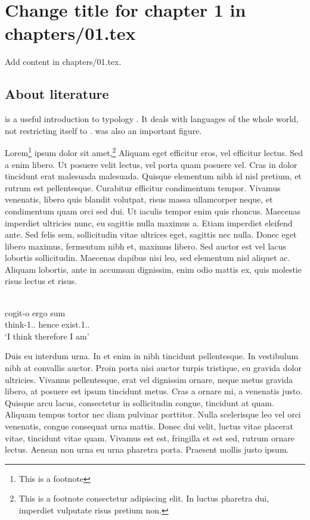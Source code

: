 \chapter{Change title for chapter 1 in chapters/01.tex}
Add content in chapters/01.tex.

\section{About literature}
\citet{Comrie1981} is a useful introduction to typology . %
It deals with languages of the whole world, not restricting itself to . %
 was also an important figure. %

Lorem\footnote{This is a footnote} ipsum dolor sit 
amet,\footnote{This is a footnote consectetur adipiscing elit. In luctus pharetra dui, imperdiet vulputate risus pretium non.} Aliquam eget efficitur eros, vel efficitur lectus. Sed a enim libero. Ut posuere velit lectus, vel porta quam posuere vel. Cras in dolor tincidunt erat malesuada malesuada. Quisque elementum nibh id nisl pretium, et rutrum est pellentesque. Curabitur efficitur condimentum tempor. Vivamus venenatis, libero quis blandit volutpat, risus massa ullamcorper neque, et condimentum quam orci sed dui. Ut iaculis tempor enim quis rhoncus. Maecenas imperdiet ultricies nunc, eu sagittis nulla maximus a. Etiam imperdiet eleifend ante. Sed felis sem, sollicitudin vitae ultrices eget, sagittis nec nulla. Donec eget libero maximus, fermentum nibh et, maximus libero. Sed auctor est vel lacus lobortis sollicitudin. Maecenas dapibus nisi leo, sed elementum nisl aliquet ac. Aliquam lobortis, ante in accumsan dignissim, enim odio mattis ex, quis molestie risus lectus et risus. 

\ea\label{ex:1:descartes}
\\
\gll cogit-o ergo sum \\
     think-1{\SG}.{\PRS}.{\IND} hence exist.1{\SG}.{\PRS}.{\IND}\\
\glt `I think therefore I am'
\z

Duis eu interdum urna. In et enim in nibh tincidunt pellentesque. In vestibulum nibh at convallis auctor. Proin porta nisi auctor turpis tristique, eu gravida dolor ultricies. Vivamus pellentesque, erat vel dignissim ornare, neque metus gravida libero, at posuere est ipsum tincidunt metus. Cras a ornare mi, a venenatis justo. Quisque arcu lacus, consectetur in sollicitudin congue, tincidunt at quam. Aliquam tempus tortor nec diam pulvinar porttitor. Nulla scelerisque leo vel orci venenatis, congue consequat urna mattis. Donec dui velit, luctus vitae placerat vitae, tincidunt vitae quam. Vivamus est est, fringilla et est sed, rutrum ornare lectus. Aenean non urna eu urna pharetra porta. Praesent mollis justo ipsum. 

